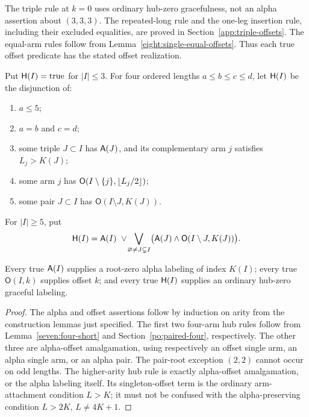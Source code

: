 The triple rule at $k=0$ uses ordinary hub-zero gracefulness, not an
alpha assertion about $(3,3,3)$.  The repeated-long rule and the one-leg
insertion rule, including their excluded equalities, are proved in
Section~\ref{app:triple-offsets}.  The equal-arm rules follow from
Lemma~\ref{eight:single-equal-offsets}.  Thus each true offset predicate
has the stated offset realization.

\begin{definition}\label{eight:hub-rule}
Put $\mathsf H(I)=\mathrm{true}$ for $|I|\le3$.  For four ordered lengths
$a\le b\le c\le d$, let $\mathsf H(I)$ be the disjunction of:
\begin{enumerate}
\item $a\le5$;
\item $a=b$ and $c=d$;
\item some triple $J\subset I$ has $\mathsf A(J)$, and its complementary
  arm $j$ satisfies $L_j>K(J)$;
\item some arm $j$ has
  $\mathsf O(I\setminus\{j\},\left\lfloor L_j/2\right\rfloor)$;
\item some pair $J\subset I$ has $\mathsf O(I\setminus J,K(J))$.
\end{enumerate}
For $|I|\ge5$, put
\[
 \mathsf H(I)=\mathsf A(I)\ \lor\!
 \bigvee_{\varnothing\ne J\subsetneq I}
 \bigl(\mathsf A(J)\land\mathsf O(I\setminus J,K(J))\bigr).
\]
\end{definition}

\begin{lemma}\label{eight:predicate-soundness}
Every true $\mathsf A(I)$ supplies a root-zero alpha labeling of index $K(I)$;
every true $\mathsf O(I,k)$ supplies offset $k$; and every true $\mathsf H(I)$
supplies an ordinary hub-zero graceful labeling.
\end{lemma}
\begin{proof}
The alpha and offset assertions follow by induction on arity from the
construction lemmas just specified.  The first two four-arm hub rules
follow from Lemma~\ref{seven:four-short} and
Section~\ref{po:paired-four}, respectively. The other three are
alpha-offset amalgamation, using respectively an offset single arm,
an alpha single arm, or an alpha pair.  The pair-root exception $(2,2)$
cannot occur on odd lengths.  The higher-arity hub rule is exactly
alpha-offset amalgamation, or the alpha labeling itself.  Its
singleton-offset term is the ordinary arm-attachment condition $L>K$;
it must not be confused with the alpha-preserving condition
$L>2K$, $L\ne4K+1$.
\end{proof}

